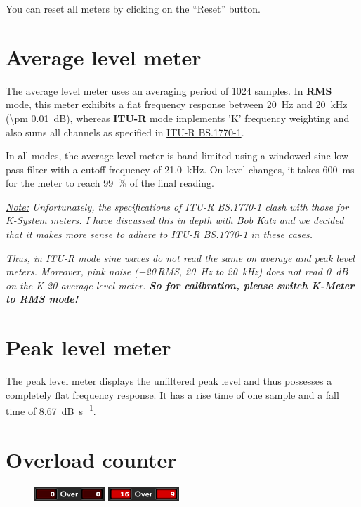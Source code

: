 You can reset all meters by clicking on the ``Reset'' button.

\section{Average level meter}

The average level meter uses an averaging period of \num{1024}
samples.  In \textbf{RMS} mode, this meter exhibits a flat frequency
response between \SI{20}{\hertz} and \SI{20}{\kilo\hertz} (\SI{\pm
  0.01}{\dB}), whereas \textbf{ITU-R} mode implements 'K' frequency
weighting and also sums all channels as specified in
\href{http://www.itu.int/rec/R-REC-BS.1770}{ITU-R BS.1770-1}.

In all modes, the average level meter is band-limited using a
windowed-sinc low-pass filter with a cutoff frequency of
\SI{21.0}{\kilo\hertz}.  On level changes, it takes
\SI{600}{\milli\second} for the meter to reach \SI{99}{\percent} of
the final reading.

\emph{\underline{Note:} Unfortunately, the specifications of ITU-R
  BS.1770-1 clash with those for K-System meters.  I have discussed
  this in depth with Bob Katz and we decided that it makes more sense
  to adhere to ITU-R BS.1770-1 in these cases.}

\emph{Thus, in ITU-R mode sine waves do \emph{not} read the same on
  average and peak level meters.  Moreover, pink noise
  (\SI{-20}{\dBFS}\,RMS, \SI{20}{\hertz} to \SI{20}{\kilo\hertz}) does
  \emph{not} read \SI{0}{\dB} on the K-20 average level meter.
  \textbf{So for calibration, please switch K-Meter to RMS mode!}}

\section{Peak level meter}

The peak level meter displays the unfiltered peak level and thus
possesses a completely flat frequency response.  It has a rise time of
one sample and a fall time of \SI{8.67}{\dB\per\second}.

\section{Overload counter}

\begin{figure}
\includegraphics[scale=\screenshotscale,clip]{include/images/overload_counter_normal.png}
\newline
\includegraphics[scale=\screenshotscale,clip]{include/images/overload_counter_clipped.png}
\end{figure}

